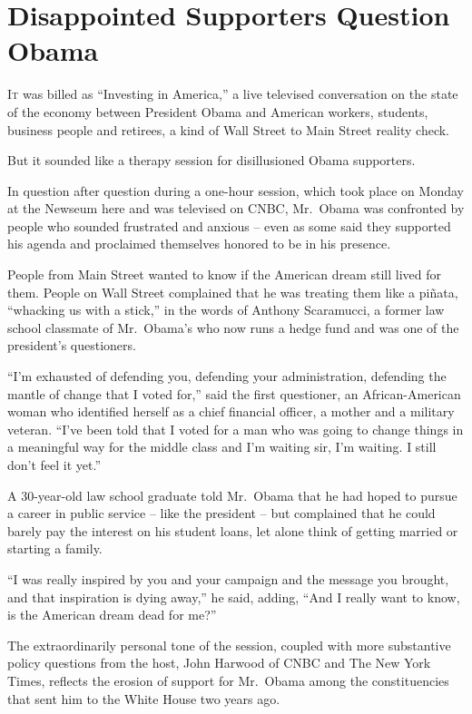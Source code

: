 ﻿\documentclass[12pt]{article}
\begin{document}
\pagebreak
\section{Disappointed Supporters Question Obama}

\lettrine{I}{t} was billed as ``Investing in America,'' a live televised
conversation on the state of the economy between President Obama and American workers, students,
business people and retirees, a kind of Wall Street to Main Street reality check.

But it sounded like a therapy session for disillusioned Obama supporters.

In question after question during a one-hour session, which took place on Monday at the Newseum here
and was televised on CNBC, Mr.~Obama was confronted by people who sounded frustrated and anxious --
even as some said they supported his agenda and proclaimed themselves honored to be in his presence.

People from Main Street wanted to know if the American dream still lived for them. People on Wall
Street complained that he was treating them like a pi\~{n}ata, ``whacking us with a stick,'' in the
words of Anthony Scaramucci, a former law school classmate of Mr.~Obama's who now runs a hedge fund
and was one of the president's questioners.

``I'm exhausted of defending you, defending your administration, defending the mantle of change that
I voted for,'' said the first questioner, an African-American woman who identified herself as a
chief financial officer, a mother and a military veteran. ``I've been told that I voted for a man
who was going to change things in a meaningful way for the middle class and I'm waiting sir, I'm
waiting. I still don't feel it yet.''

A 30-year-old law school graduate told Mr.~Obama that he had hoped to pursue a career in public
service -- like the president -- but complained that he could barely pay the interest on his student
loans, let alone think of getting married or starting a family.

``I was really inspired by you and your campaign and the message you brought, and that inspiration
is dying away,'' he said, adding, ``And I really want to know, is the American dream dead for me?''

The extraordinarily personal tone of the session, coupled with more substantive policy questions
from the host, John Harwood of CNBC and The New York Times, reflects the erosion of support for
Mr.~Obama among the constituencies that sent him to the White House two years ago.
\end{document}
